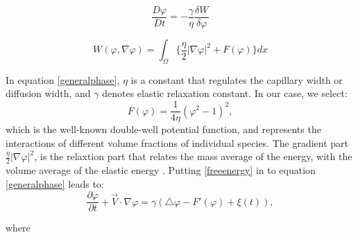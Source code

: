 \documentclass[letterpaper,10pt]{article}
\begin{document}
\begin{equation}
 \label{generalphase}
\frac{D \varphi }{D t} = - \frac{\gamma}{\eta} \frac{\delta W} {\delta \varphi} 
\end{equation}

\begin{equation}
 \label{ginzlandu}
 W(\varphi,\nabla \varphi) = \int_\Omega \lbrace\frac{\eta}{2} |\nabla \varphi|^2 + F(\varphi) \rbrace dx
\end{equation}

In equation \eqref{generalphase}, $ \eta $ is a constant that regulates the capillary width or diffusion width, and $ \gamma $ denotes elastic relaxation constant. In our case, we select:
\begin{equation}
 \label{freeenergy}
  F(\varphi)=\frac{1}{4\eta} (\varphi^2-1)^2 ,
  \end{equation}
which is the well-known double-well potential function, and represents the interactions of different volume fractions of individual species. The gradient part $ \frac{\eta}{2} |\nabla \varphi|^2  $, is the relaxtion part that relates the mass average of the energy, with the volume average of the elastic energy \cite{Bronsard1990,Larson1999}.
Putting \eqref{freeenergy} in to equation \eqref{generalphase} leads to: 
\begin{equation} 
\label{allencahn}
\frac{\partial \varphi }{\partial t} + \overrightarrow{V}\cdot \nabla \varphi = 
\gamma (\bigtriangleup\varphi -F'(\varphi)+\xi(t)),
\end{equation}

where
\end{document}
